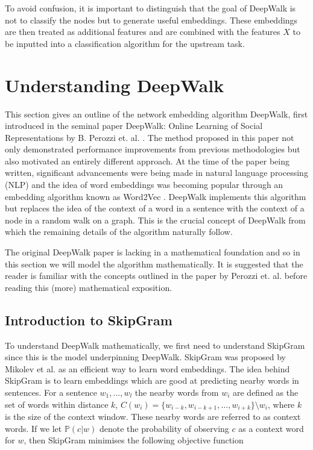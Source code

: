 \documentclass[a4paper]{article}
\renewcommand{\P}{\mathbb P}
\begin{document}
To avoid confusion, it is important to distinguish that the goal of DeepWalk is
not to classify the nodes but to generate useful embeddings. These embeddings
are then treated as additional features and are combined with the features $X$
to be inputted into a classification algorithm for the upstream task.
\section{Understanding DeepWalk}
This section gives an outline of the network embedding algorithm
DeepWalk, first introduced in the seminal paper DeepWalk: Online Learning of
Social Representations by B. Perozzi et. al. \cite{deepwalk}. The method proposed in
this paper not only demonstrated performance improvements from previous methodologies but
also motivated an entirely different approach. At the time of the paper being
written, significant advancements were being made in natural language processing (NLP)
and the idea of word embeddings was becoming popular through an embedding
algorithm known as Word2Vec \cite{mikolov2013efficient,mikolov2013distributed}.
DeepWalk implements this algorithm but replaces the idea of the context of a word in
a sentence with the context of a node in a random walk on a graph. This is the
crucial concept of DeepWalk from which the remaining details of the algorithm naturally follow.

The original DeepWalk paper is lacking in a mathematical foundation and so in
this section we will model the algorithm mathematically. It is suggested that the reader
is familiar with the concepts outlined in the paper by Perozzi et. al. \cite{deepwalk} before reading this (more) mathematical exposition.
\subsection{Introduction to SkipGram}
To understand DeepWalk mathematically, we first need to understand SkipGram since this is the model underpinning DeepWalk. SkipGram was
proposed by Mikolev et al. \cite{mikolov2013efficient} as an efficient way to
learn word embeddings. The idea behind SkipGram is to learn embeddings which are good at
predicting nearby words in sentences. For a sentence $w_1, ... , w_l$ the
nearby words from $w_i$ are defined as the set of words
within distance $k$, $C(w_i) = \{w_{i-k}, w_{i-k+1}, \dots , w_{i+k}\} \setminus w_i$, where $k$ is the size of the context window. These nearby words are referred to as context words. If we let $\P(c|w)$ denote the probability of observing $c$ as a context word for $w$, then SkipGram
minimises the following objective function
\end{document}
